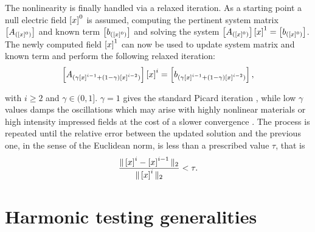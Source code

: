 The nonlinearity is finally handled via a relaxed iteration. As a starting point a null electric field $\left[{{x}}\right]^0$ is assumed, computing the pertinent system matrix $\left[A_{([x]^0)}\right]$ and known term $\left[{{b_{([x]^0)}}}\right]$ and solving the system $\left[A_{([x]^0)}\right] \left[{{x}}\right]^1 = \left[{{b_{([x]^0)}}}\right]$. The newly computed field $\left[{{x}}\right]^1$ can now be used to update system matrix and known term and perform the following relaxed iteration:
\begin{equation} \label{eq:lastLinearSystem}
 \left[A_{(\gamma \left[{{x}}\right]^{i-1} + (1-\gamma) \left[{{x}}\right]^{i-2})}\right] \left[{{x}}\right]^{i} = \left[{{b_{(\gamma \left[{{x}}\right]^{i-1} + (1-\gamma) \left[{{x}}\right]^{i-2})}}}\right],
\end{equation}

\noindent with $i \geq 2$ and $\gamma\in(0,1]$. $\gamma=1$ gives the standard Picard iteration \cite{Guarnieri2010}, while low $\gamma$ values damps the oscillations
which may arise with highly nonlinear materials or high intensity impressed
fields at the cost of a slower convergence \cite{Silvester1997}. The process 
is repeated until the relative error between the updated solution
and the previous one, in the sense of the Euclidean norm, is less than a
prescribed value $\tau$, that is
$$ \frac{\Vert\left[{{x}}\right]^{i}-\left[{{x}}\right]^{i-1} \Vert_2}{\Vert\left[{{x}}\right]^{i}\Vert_2} < \tau.$$

\section{Harmonic testing generalities}

